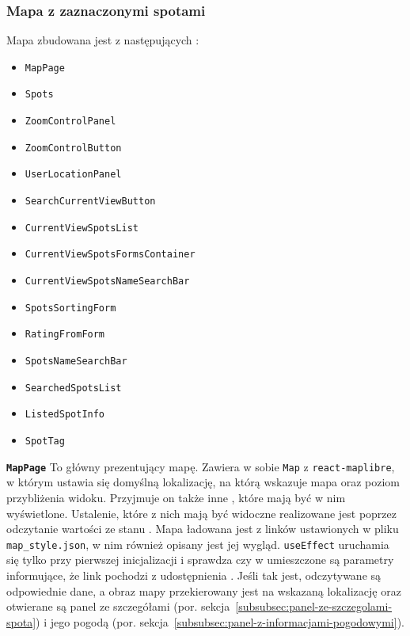 
\subsubsection{Mapa z zaznaczonymi spotami}
\label{subsubsec:mapa-z-zaznaczonymi-spotami}

Mapa zbudowana jest z następujących :
\begin{itemize}
    \item \texttt{MapPage}
    \item \texttt{Spots}
    \item \texttt{ZoomControlPanel}
    \item \texttt{ZoomControlButton}
    \item \texttt{UserLocationPanel}
    \item \texttt{SearchCurrentViewButton}
    \item \texttt{CurrentViewSpotsList}
    \item \texttt{CurrentViewSpotsFormsContainer}
    \item \texttt{CurrentViewSpotsNameSearchBar}
    \item \texttt{SpotsSortingForm}
    \item \texttt{RatingFromForm}
    \item \texttt{SpotsNameSearchBar}
    \item \texttt{SearchedSpotsList}
    \item \texttt{ListedSpotInfo}
    \item \texttt{SpotTag}
\end{itemize}

\textbf{\texttt{MapPage}}
To główny  prezentujący mapę.
Zawiera w sobie \texttt{Map} z  \texttt{react-maplibre}, w którym ustawia się domyślną
lokalizację, na którą wskazuje mapa oraz poziom przybliżenia widoku.
Przyjmuje on także inne , które mają być w nim wyświetlone.
Ustalenie, które z nich mają być widoczne realizowane jest poprzez odczytanie wartości ze stanu .
Mapa ładowana jest z linków ustawionych w pliku \newline \texttt{map\_style.json}, w nim również opisany jest jej wygląd.
 \texttt{useEffect} uruchamia się tylko przy pierwszej inicjalizacji 
i sprawdza czy w  umieszczone są parametry informujące, że link pochodzi z udostępnienia
.
Jeśli tak jest, odczytywane są odpowiednie dane, a obraz mapy przekierowany jest na wskazaną lokalizację oraz
otwierane są panel ze szczegółami  (por. sekcja~\ref{subsubsec:panel-ze-szczegolami-spota})
i jego pogodą (por. sekcja~\ref{subsubsec:panel-z-informacjami-pogodowymi}).

